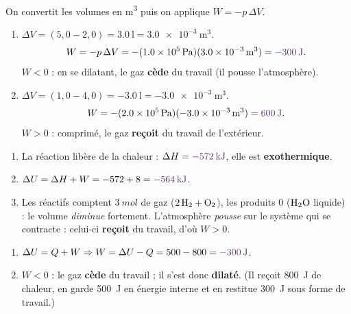\documentclass[11pt,a4paper]{article}
\newcommand{\dH}{\Delta H}
\newcommand{\dU}{\Delta U}
\newcommand{\rep}[1]{\textcolor{primarydark}{\textbf{#1}}}
\begin{document}
\begin{center}
\end{center}

\begin{correction}
On convertit les volumes en \si{\cubic\metre} puis on applique $W=-p\,\Delta V$.
\begin{enumerate}[label=\alph*),leftmargin=2em,topsep=2pt,itemsep=3pt]
  \item $\Delta V = (5{,}0-2{,}0)=\SI{3.0}{\litre}=\SI{3.0e-3}{\cubic\metre}$.
        \[ W = -p\,\Delta V = -(\SI{1.0e5}{\pascal})(\SI{3.0e-3}{\cubic\metre}) = \rep{\SI{-300}{\joule}}. \]
        $W<0$ : en se dilatant, le gaz \rep{cède} du travail (il pousse l'atmosphère).
  \item $\Delta V = (1{,}0-4{,}0)=\SI{-3.0}{\litre}=\SI{-3.0e-3}{\cubic\metre}$.
        \[ W = -(\SI{2.0e5}{\pascal})(\SI{-3.0e-3}{\cubic\metre}) = \rep{\SI{+600}{\joule}}. \]
        $W>0$ : comprimé, le gaz \rep{reçoit} du travail de l'extérieur.
\end{enumerate}
\end{correction}

\begin{correction}[relier $\dH$, $W$ et $\dU$]
\begin{enumerate}[label=\alph*),leftmargin=2em,topsep=2pt,itemsep=2pt]
  \item La réaction libère de la chaleur : $\dH = \rep{\SI{-572}{\kilo\joule}}$, elle est \rep{exothermique}.
  \item $\dU = \dH + W = -572 + 8 = \rep{\SI{-564}{\kilo\joule}}$.
  \item Les réactifs comptent $3\ \si{mol}$ de gaz ($2\,\ce{H2}+\ce{O2}$), les produits $0$ ($\ce{H2O}$
        liquide) : le volume \emph{diminue} fortement. L'atmosphère \emph{pousse} sur le système qui se
        contracte : celui-ci \rep{reçoit} du travail, d'où $W>0$.
\end{enumerate}
\end{correction}

\begin{correction}
\begin{enumerate}[label=\alph*),leftmargin=2em,topsep=2pt,itemsep=2pt]
  \item $\dU = Q + W \Rightarrow W = \dU - Q = 500 - 800 = \rep{\SI{-300}{\joule}}$.
  \item $W<0$ : le gaz \rep{cède} du travail ; il s'est donc \rep{dilaté}. (Il reçoit \SI{800}{\joule} de
        chaleur, en garde \SI{500}{\joule} en énergie interne et en restitue \SI{300}{\joule} sous forme de travail.)
\end{enumerate}
\end{correction}
\end{document}
